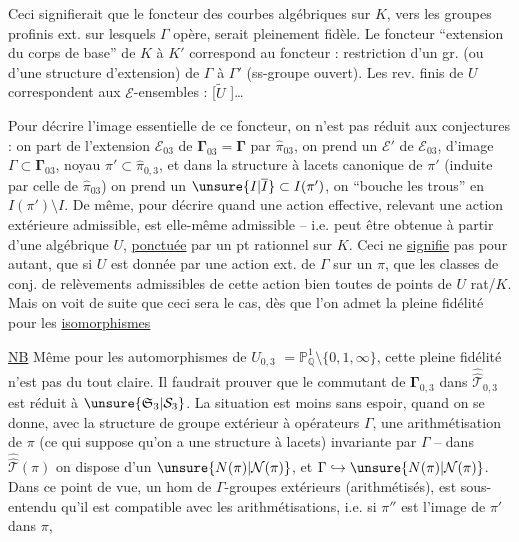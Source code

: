 Ceci signifierait que le foncteur des courbes
algébriques sur $K$, vers les groupes profinis ext.
sur lesquels $\Gamma$ opère, serait pleinement fidèle.
Le foncteur ``extension du corps de base'' de
$K$ à $K'$ correspond au foncteur : restriction
d'un gr.  (ou d'une structure
d'extension) de $\Gamma$ à $\Gamma'$ (ss-groupe ouvert).
Les rev.  finis de $U$ correspondent aux
$\mathcal E$-ensembles : [$\widetilde U$ ]\ldots

Pour décrire l'image essentielle de ce
foncteur, on n'est pas réduit aux conjectures :
on part de l'extension  $\mathcal E_{03}$ de $\boldsymbol{\Gamma}_{03}=\boldsymbol{\Gamma}$
par $\widehat{\pi}_{03}$, on prend un   $\mathcal E'$
de $\mathcal E_{03}$, d'image $\Gamma\subset\boldsymbol{\Gamma}_{03}$, noyau
$\pi'\subset\widehat{\pi}_{0,3}$, et dans la structure à lacets
canonique de $\pi'$ (induite par celle de $\widehat{\pi}_{03}$)
on prend un $\unsure{I|\overline I}\subset I(\pi')$,  on ``bouche les trous''
en $I(\pi')\setminus I$. De même, pour décrire quand
une action effective, relevant une action extérieure
admissible, est elle-même admissible -- 
i.e. peut être obtenue à partir d'une 
algébrique $U$, \uline{ponctuée} par un pt rationnel sur $K$.
Ceci ne \uline{signifie} pas pour autant, que si
$U$ est donnée par une action ext. de $\Gamma$ sur un $\pi$,
que les classes de conj. de relèvements admissibles
de cette action  bien toutes de
points de $U$ rat/$K$. Mais on voit de suite que
ceci sera le cas, dès que l'on admet la
pleine fidélité pour les \uline{isomorphismes}

\uline{NB} Même pour les automorphismes de $U_{0,3}$
$=\mathbb P^1_{\mathbb Q}\setminus\{0,1,\infty\}$, cette pleine fidélité n'est pas
du tout claire. Il faudrait prouver que 
le commutant de $\boldsymbol{\Gamma}_{0,3}$ dans $\widehat{\widehat{\mathcal T}}_{0,3}$ est réduit
à $\unsure{\mathfrak S_3|\mathcal S_3}$. La situation est moins sans espoir,
quand on se donne, avec la structure de
groupe  extérieur à opérateurs $\Gamma$, une arithmétisation
de $\pi$ (ce qui suppose qu'on a 
une structure à lacets) invariante par  $\Gamma$
--  dans $\widehat{\widehat{\mathcal T}}(\pi)$ on dispose d'un $\unsure{N(\pi)|\mathcal N(\pi)}$,
et $\Gamma\hookrightarrow\unsure{N(\pi)|\mathcal N(\pi)}$. Dans ce point de vue,  un
hom  de $\Gamma$-groupes extérieurs (arithmétisés),
 est sous-entendu qu'il est compatible avec
les arithmétisations, i.e. si $\pi''$ est l'image de $\pi'$ dans $\pi$,

